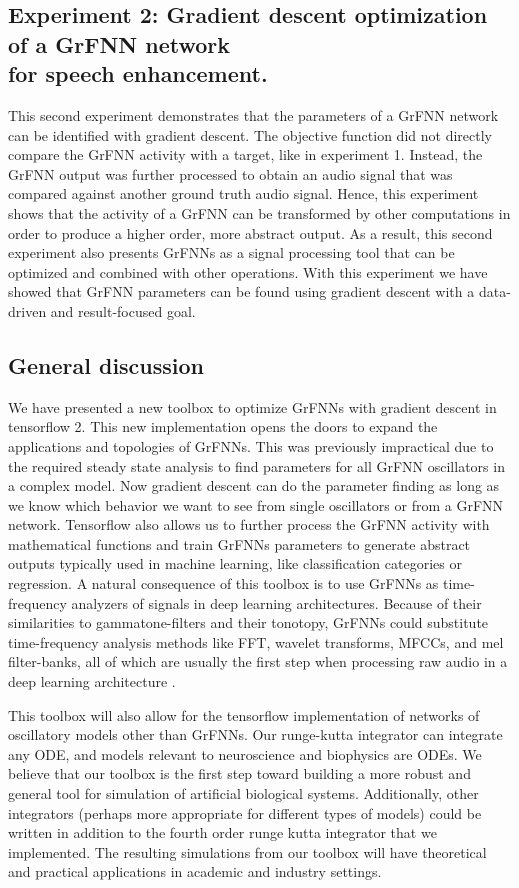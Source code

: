 \documentclass{report}
\begin{document}
\subsection{Experiment 2: Gradient descent optimization of a GrFNN network \\ for speech enhancement.} 

This second experiment demonstrates that the parameters of a GrFNN network can be identified with gradient descent. The objective function did not directly compare the GrFNN activity with a target, like in experiment 1. Instead, the GrFNN output was further processed to obtain an audio signal that was compared against another ground truth audio signal. Hence, this experiment shows that the activity of a GrFNN can be transformed by other computations in order to produce a higher order, more abstract output. As a result, this second experiment also presents GrFNNs as a signal processing tool that can be optimized and combined with other operations. With this experiment we have showed that GrFNN parameters can be found using gradient descent with a data-driven and result-focused goal.

\subsection{General discussion}

We have presented a new toolbox to optimize GrFNNs with gradient descent in tensorflow 2. This new implementation opens the doors to expand the applications and topologies of GrFNNs. This was previously impractical due to the required steady state analysis to find parameters for all GrFNN oscillators in a complex model. Now gradient descent can do the parameter finding as long as we know which behavior we want to see from single oscillators or from a GrFNN network. Tensorflow also allows us to further process the GrFNN activity with mathematical functions and train GrFNNs parameters to generate abstract outputs typically used in machine learning, like classification categories or regression. A natural consequence of this toolbox is to use GrFNNs as time-frequency analyzers of signals in deep learning architectures. Because of their similarities to gammatone-filters and their tonotopy, GrFNNs could substitute time-frequency analysis methods like FFT, wavelet transforms, MFCCs, and mel filter-banks, all of which are usually the first step when processing raw audio in a deep learning architecture \cite{purwins2019deep}.

This toolbox will also allow for the tensorflow implementation of networks of oscillatory models other than GrFNNs. Our runge-kutta integrator can integrate any ODE, and models relevant to neuroscience and biophysics are ODEs. We believe that our toolbox is the first step toward building a more robust and general tool for simulation of artificial biological systems. Additionally, other integrators (perhaps more appropriate for different types of models) could be written in addition to the fourth order runge kutta integrator that we implemented. The resulting simulations from our toolbox will have theoretical and practical applications in academic and industry settings. 
\end{document}
